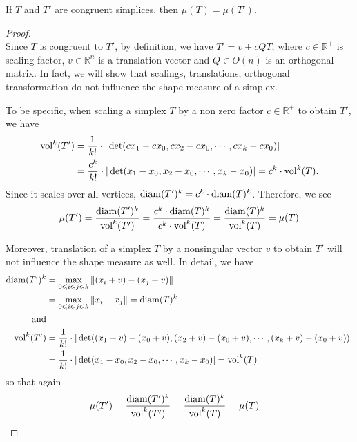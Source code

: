     \begin{lemma*}
    If $T$ and $T'$ are congruent simplices, then $\mu(T) = \mu(T')$.
    \end{lemma*}
    \begin{proof}\mbox{}\\
    Since $T$ is congruent to $T'$, by definition, we have $T' = v + cQT$, where $c\in\mathbb{R}^{+}$ is scaling factor, $v\in\mathbb{R}^n$ is a translation vector and $Q\in O(n)$ is an orthogonal matrix. In fact, we will show that scalings, translations, orthogonal transformation do not influence the shape measure of a simplex. 
    
    To be specific, when scaling a simplex $T$ by a non zero factor $c\in\mathbb{R}^{+}$ to obtain $T'$, we have 
    \begin{align*}
     \operatorname{vol}^k(T') &= \frac{1}{k!}\cdot|\det(cx_1-cx_0, cx_2-cx_0,\cdots, cx_k-cx_0)| \\
               &= \frac{c^k}{k!}\cdot|\det(x_1-x_0, x_2-x_0,\cdots, x_k-x_0)| = c^k\cdot \operatorname{vol}^k(T).
    \end{align*}
    Since it scales over all vertices, $\operatorname{diam}(T')^k = c^k\cdot \operatorname{diam}(T)^k$. Therefore, we see
    \begin{align*}
    \mu(T') = \frac{\operatorname{diam}(T')^k}{\operatorname{vol}^k(T')} = \frac{c^k\cdot \operatorname{diam}(T)^k}{c^k\cdot \operatorname{vol}^k(T)} = \frac{\operatorname{diam}(T)^k}{\operatorname{vol}^k(T)} = \mu(T)
    \end{align*}

    Moreover, translation of a simplex $T$ by a nonsingular vector $v$ to obtain $T'$ will not influence the shape measure as well. In detail, we have
    \begin{align*}
    \operatorname{diam}(T')^k &= \max_{0\leqslant i\leqslant j\leqslant k} \|(x_i + v) - (x_j + v)\|\\ 
               &= \max_{0\leqslant i\leqslant j\leqslant k}\|x_i - x_j\| = \operatorname{diam}(T)^k \\
    \text{and}\\
    \operatorname{vol}^k(T') &= \frac{1}{k!}\cdot|\det((x_1+v) - (x_0+v), (x_2+v)-(x_0+v),\cdots,(x_k+v)-(x_0+v))|\\
              &= \frac{1}{k!}\cdot|\det(x_1-x_0, x_2-x_0,\cdots, x_k-x_0)| = \operatorname{vol}^k(T)\\
    \end{align*}
    so that again  
    \begin{align*}
    \mu(T') &= \frac{\operatorname{diam}(T')^k}{\operatorname{vol}^k(T')} = \frac{\operatorname{diam}(T)^k}{\operatorname{vol}^k(T)} = \mu(T)
    \end{align*}


\end{proof}
